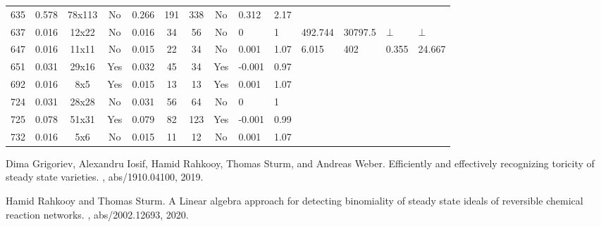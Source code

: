 \documentclass[11pt]{article}
\begin{document}
\begin{landscape}
\begin{small}
\begin{longtable}[c]{| c | c | c | c |c |c |c |c |p{1.5cm} |p{1.5cm} |p{1.5cm} |p{1.5cm} |p{1.5cm} |p{1.5cm} |}
635 & 0.578 & 78x113 & No & 0.266 & 191 & 338 & No & 0.312 & 2.17 &  &  &  & \\
637 & 0.016 & 12x22 & No & 0.016 & 34 & 56 & No & 0 & 1 & 492.744 & 30797.5 & $\bot$ & $\bot$\\
647 & 0.016 & 11x11 & No & 0.015 & 22 & 34 & No & 0.001 & 1.07 & 6.015 & 402 & 0.355 & 24.667\\
651 & 0.031 & 29x16 & Yes & 0.032 & 45 & 34 & Yes & -0.001 & 0.97 &  &  &  & \\
692 & 0.016 & 8x5 & Yes & 0.015 & 13 & 13 & Yes & 0.001 & 1.07 &  &  &  & \\
724 & 0.031 & 28x28 & No & 0.031 & 56 & 64 & No & 0 & 1 &  &  &  & \\
725 & 0.078 & 51x31 & Yes & 0.079 & 82 & 123 & Yes & -0.001 & 0.99 &  &  &  & \\
732 & 0.016 & 5x6 & No & 0.015 & 11 & 12 & No & 0.001 & 1.07 &  &  &  & \\


 \end{longtable}

\end{small}
\begin{thebibliography}{10}
Dima Grigoriev, Alexandru Iosif, Hamid Rahkooy, Thomas Sturm, and Andreas
  Weber.
\newblock Efficiently and effectively recognizing toricity of steady state
  varieties.
, abs/1910.04100, 2019.


Hamid Rahkooy and Thomas Sturm.
\newblock A Linear algebra approach for detecting binomiality of steady state ideals of reversible chemical reaction networks.
, abs/2002.12693, 2020.


\end{thebibliography}
\end{landscape}
\end{document}
